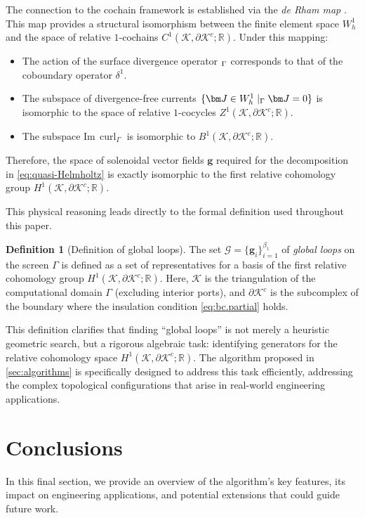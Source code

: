 \documentclass[a4paper,twoside,10pt]{article}
\theoremstyle{plain}
\theoremstyle{definition}
\newtheorem{definition}{Definition}[section]
\theoremstyle{remark}
\newcommand{\mc}{\mathcal}
\newcommand{\R}{\mathbb{R}}
\newcommand{\K}{\mc{K}}
\newcommand{\cochain}[1]{\mathbf #1}
\let\div\relax
\DeclareMathOperator{\div}{div}
\DeclareMathOperator{\curl}{curl}
\begin{document}
The connection to the cochain framework is established via the \emph{de Rham map} \cite{arnold2018finite,dodziuk1976finite}.
This map provides a structural isomorphism between the finite element space $W^1_h$ and the space of relative $1$-cochains $C^1(\K, \partial \K^c; \mathbb{R})$.
Under this mapping:
\begin{itemize}
    \item The action of the surface divergence operator $\div_\Gamma$ corresponds to that of the coboundary operator $\delta^1$.
\item The subspace of divergence-free currents $\{\bm J \in W^1_h \mid \div_\Gamma \bm J = 0\}$ is isomorphic to the space of relative $1$-cocycles $Z^1(\K, \partial \K^c; \mathbb{R})$.
\item The subspace $\mathrm{Im} \, \curl_\Gamma$ is isomorphic to $B^1(\K, \partial \K^c; \mathbb{R})$.
\end{itemize}
Therefore, the space of solenoidal vector fields $\bm g$ required for the decomposition in \cref{eq:quasi-Helmholtz} is exactly isomorphic to the first relative cohomology group $H^1(\K, \partial \K^c; \R)$.

This physical reasoning leads directly to the formal definition used throughout this paper.
\begin{definition}[Definition of global loops]
\label{def:global.loops}
The set $\mc G = \{\cochain g_i \}_{i=1}^{\beta_1}$ of \emph{global loops} on the screen $\Gamma$ is defined as a set of representatives for a basis of the first relative cohomology group $H^1(\K, \partial \K^c; \mathbb{R})$.
Here, $\K$ is the triangulation of the computational domain $\Gamma$ (excluding interior ports), and $\partial \K^c$ is the subcomplex of the boundary where the insulation condition \cref{eq:bc.partial} holds.
\end{definition}
This definition clarifies that finding ``global loops'' is not merely a heuristic geometric search, but a rigorous algebraic task: identifying generators for the relative cohomology space $H^1(\K, \partial \K^c; \R)$.
The algorithm proposed in \cref{sec:algorithms} is specifically designed to 
address this task efficiently, addressing the complex topological configurations that arise in real-world engineering applications.
\section{Conclusions}

In this final section, we provide an overview of the algorithm's key features, its impact on engineering applications, and potential extensions that could guide future work.
\end{document}
